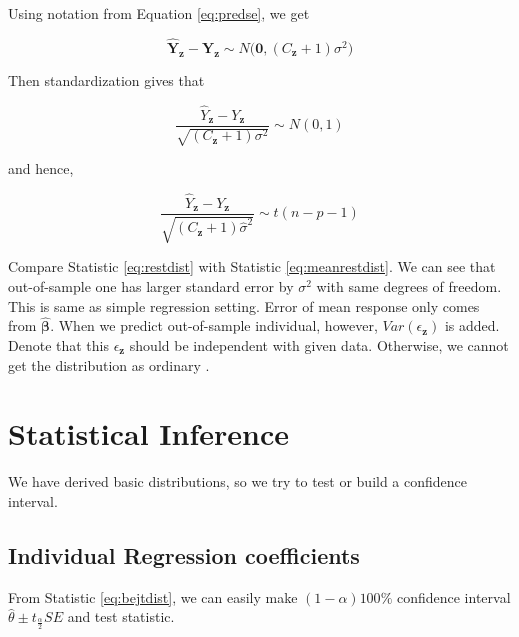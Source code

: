 \documentclass[]{book}
\theoremstyle{definition}
\theoremstyle{definition}
\theoremstyle{definition}
\theoremstyle{remark}
\begin{document}
Using notation from Equation \eqref{eq:predse}, we get

\begin{equation}
  \hat{\mathbf{Y}}_{\mathbf{z}} - \mathbf{Y}_{\mathbf{z}} \sim N\bigg( \mathbf{0}, (C_{\mathbf{z}} + 1)\sigma^2 \bigg)
  \label{eq:resdistn}
\end{equation}

Then standardization gives that

\begin{equation}
  \frac{\hat{Y}_{\mathbf{z}} - Y_{\mathbf{z}}}{\sqrt{(C_{\mathbf{z}} + 1)\sigma^2}} \sim N(0, 1)
  \label{eq:reszdist}
\end{equation}

and hence,

\begin{equation}
  \frac{\hat{Y}_{\mathbf{z}} - Y_{\mathbf{z}}}{\sqrt{(C_{\mathbf{z}} + 1)\hat\sigma^2}} \sim t(n - p - 1)
  \label{eq:restdist}
\end{equation}

Compare Statistic \eqref{eq:restdist} with Statistic \eqref{eq:meanrestdist}. We can see that out-of-sample one has larger standard error by \(\sigma^2\) with same degrees of freedom. This is same as simple regression setting. Error of mean response only comes from \(\boldsymbol{\hat\beta}\). When we predict out-of-sample individual, however, \(Var(\epsilon_{\mathbf{z}})\) is added. Denote that this \(\epsilon_{\mathbf{z}}\) should be independent with given data. Otherwise, we cannot get the distribution as ordinary \citep{Johnson:2013aa}.

\hypertarget{statistical-inference-1}{%
\section{Statistical Inference}\label{statistical-inference-1}}

We have derived basic distributions, so we try to test or build a confidence interval.

\hypertarget{individual-regression-coefficients-1}{%
\subsection{Individual Regression coefficients}\label{individual-regression-coefficients-1}}

From Statistic \eqref{eq:bejtdist}, we can easily make \((1 - \alpha)100\%\) confidence interval \(\hat\theta \pm t_{\frac{\alpha}{2}} SE\) and test statistic.
\end{document}
